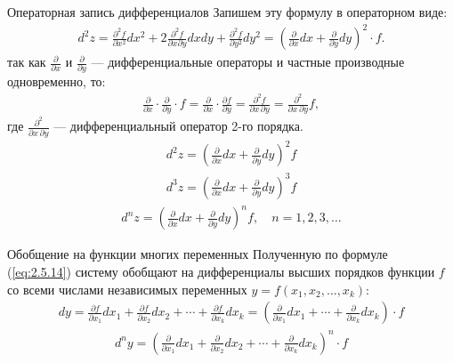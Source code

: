 \begin{tbox}{Операторная запись дифференциалов}
	Запишем эту формулу в операторном виде:
	\begin{align*}
		d^2 z = \frac{\partial^2 f}{\partial x^2} dx^2 + 2 \frac{\partial^2 f}{\partial x \partial y} dx dy + \frac{\partial^2 f}{\partial y^2} dy^2
		= \left( \frac{\partial}{\partial x} dx + \frac{\partial}{\partial y} dy \right)^2 \cdot f.
	\end{align*}
	так как $\frac{\partial}{\partial x}$ и $\frac{\partial}{\partial y}$ — дифференциальные операторы и частные производные одновременно, то:
	\begin{align*}
		\frac{\partial}{\partial x} \cdot \frac{\partial}{\partial y} \cdot f = \frac{\partial}{\partial x} \cdot \frac{\partial f}{\partial y} = \frac{\partial^2 f}{\partial x \, \partial y} = \frac{\partial^2}{\partial x \, \partial y} f,
	\end{align*}
	где $\frac{\partial^2}{\partial x \, \partial y}$ — дифференциальный оператор 2-го порядка.
	\begin{align} \label{eq:2.5.12}
		\boxed{d^2 z = \left( \frac{\partial}{\partial x} dx + \frac{\partial}{\partial y} dy \right)^2 f}
	\end{align}
	\vspace{-1em}
	\begin{align} \label{eq:2.5.13}
		\boxed{d^3 z = \left( \frac{\partial}{\partial x} dx + \frac{\partial}{\partial y} dy \right)^3 f}
	\end{align}
	\vspace{-1em}
	\begin{align} \label{eq:2.5.14}
		\boxed{d^n z = \left( \frac{\partial}{\partial x} dx + \frac{\partial}{\partial y} dy \right)^n f}, \quad n = 1, 2, 3, \dots
	\end{align}
\end{tbox}

\begin{tbox}{Обобщение на функции многих переменных}
	Полученную по формуле (\ref{eq:2.5.14}) систему обобщают на дифференциалы высших порядков функции $f$ со всеми числами независимых переменных $y = f(x_1, x_2, \dots, x_k)$:
	\begin{align*}
		d y = \frac{\partial f}{\partial x_1} d x_1 + \frac{\partial f}{\partial x_2} d x_2 + \cdots + \frac{\partial f}{\partial x_k} d x_k = \left(\frac{\partial}{\partial x_1} d x_1 + \cdots + \frac{\partial}{\partial x_k} d x_k \right) \cdot f
	\end{align*}
	\vspace{-2em}
	\begin{align*}
		d^n y = \left(\frac{\partial}{\partial x_1} d x_1 + \frac{\partial}{\partial x_2} d x_2 + \cdots + \frac{\partial}{\partial x_k} d x_k \right)^n \cdot f
	\end{align*}
\end{tbox}
